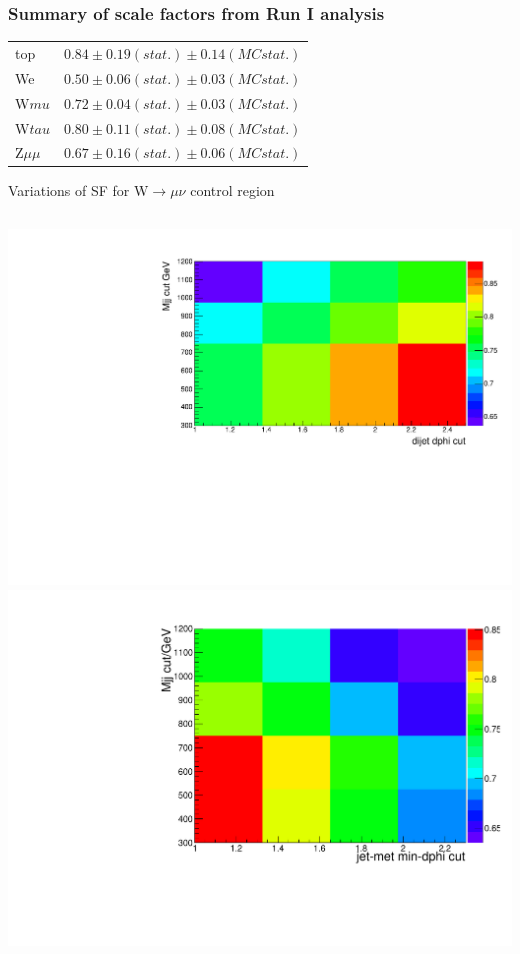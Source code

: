 \documentclass[red,compress,xcolor=table]{beamer}
\begin{document}
\begin{frame}
\frametitle{Summary of scale factors from Run I analysis}

\begin{center}
{\scriptsize
{}
\begin{tabular}{|l|c|}
\hline
top &  $0.84 \pm 0.19(stat.)\pm0.14(MC stat.)$ \\
We &  $0.50 \pm 0.06(stat.)\pm0.03(MC stat.)$ \\
W$mu$ & $ 0.72 \pm 0.04(stat.)\pm0.03(MC stat.)$\\
W$tau$ & $ 0.80 \pm 0.11(stat.)\pm0.08(MC stat.)$\\
Z$\mu\mu$ & $0.67 \pm 0.16( stat.) \pm 0.06( MCstat.)$\\
\hline
\end{tabular}
}
\end{center}
\begin{block}{\scriptsize Variations of SF for W$\rightarrow\mu\nu$ control region}
\begin{columns}
\includegraphics[width=1.0\textwidth]{./dphijjmjj.pdf}
\includegraphics[width=1.0\textwidth]{./jetmetdphimjj.pdf}
\end{columns}
\end{block}


\end{frame}
\end{document}
